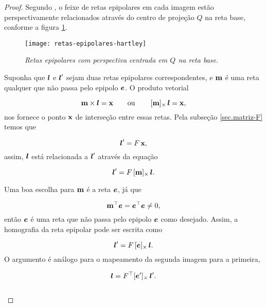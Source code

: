 \begin{proof}
Segundo \cite{Hartley2004}, o feixe de retas epipolares em cada imagem estão perspectivamente relacionados através do centro de projeção $Q$ na reta base, conforme a figura \ref{fig.retas-epi-hartley}.

\begin{figure}[!htb]
\centering
\texttt{[image: retas-epipolares-hartley]}
\caption{\textit{Retas epipolares com perspectiva centrada em $Q$ na reta base.}}
\label{fig.retas-epi-hartley}
\end{figure}


Suponha que $\boldsymbol{l}$ e $\boldsymbol{l}'$ sejam duas retas epipolares correspondentes, e ${\bf m}$ é uma reta qualquer que não passa pelo epipolo $\boldsymbol{e}$. O produto vetorial 

\begin{equation}
{\bf m}\times\boldsymbol{l}=\mathbf{x}\qquad\text{ou}\qquad\,[{\bf m}]_\times\,\boldsymbol{l}=\mathbf{x},
\end{equation}
nos fornece o ponto $\mathbf{x}$ de interseção entre essas retas. Pela subseção \ref{sec.matriz-F} temos que

\begin{equation*}
\boldsymbol{l}'=F\,\mathbf{x},
\end{equation*} 
assim, $\boldsymbol{l}$ está relacionada a $\boldsymbol{l}'$ através da equação 

\begin{equation*}
\boldsymbol{l}'=F\,[{\bf m}]_\times\,\boldsymbol{l}.
\end{equation*}


Uma boa escolha para ${\bf m}$ é a reta $\boldsymbol{e}$, já que

\begin{equation*}
{\bf m}^\top\boldsymbol{e}=\boldsymbol{e}^\top\boldsymbol{e}\neq0,
\end{equation*}
então $\boldsymbol{e}$ é uma reta que não passa pelo epipolo $\boldsymbol{e}$ como desejado. Assim, a homografia da reta epipolar pode ser escrita como 

\begin{equation*}
\boldsymbol{l}'=F\,[\boldsymbol{e}]_\times\,\boldsymbol{l}.
\end{equation*}
O argumento é análogo para o mapeamento da segunda imagem para a primeira,

\begin{equation*}
\boldsymbol{l}=F^\top [\boldsymbol{e}']_\times\,\boldsymbol{l}'.
\end{equation*}\\


\end{proof}


